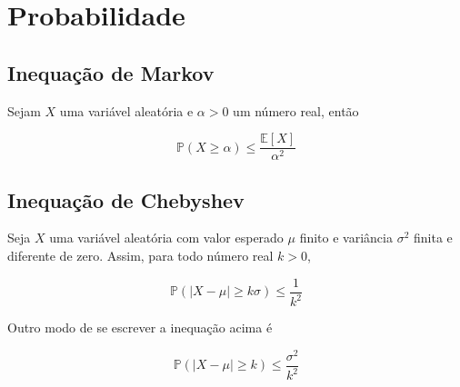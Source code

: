 \chapter{Probabilidade}
\label{ap:probability}

\section{Inequação de Markov}
\label{ap:markov}

Sejam $X$ uma variável aleatória e $\alpha > 0$ um número real, então

\[ \mathbb{P}(X \geq \alpha) \leq \frac{\mathbb{E}[X]}{\alpha^2}\]


\section{Inequação de Chebyshev}
\label{ap:chebyshev}

Seja $X$ uma variável aleatória com valor esperado $\mu$ finito e variância $\sigma^2$ finita e diferente de zero. 
Assim, para todo número real $k > 0$, 

\[ \mathbb{P}(| X - \mu| \geq k\sigma) \leq \frac{1}{k^2}\]

Outro modo de se escrever a inequação acima é 

\[ \mathbb{P}(| X - \mu| \geq k) \leq \frac{\sigma^2}{k^2} \]